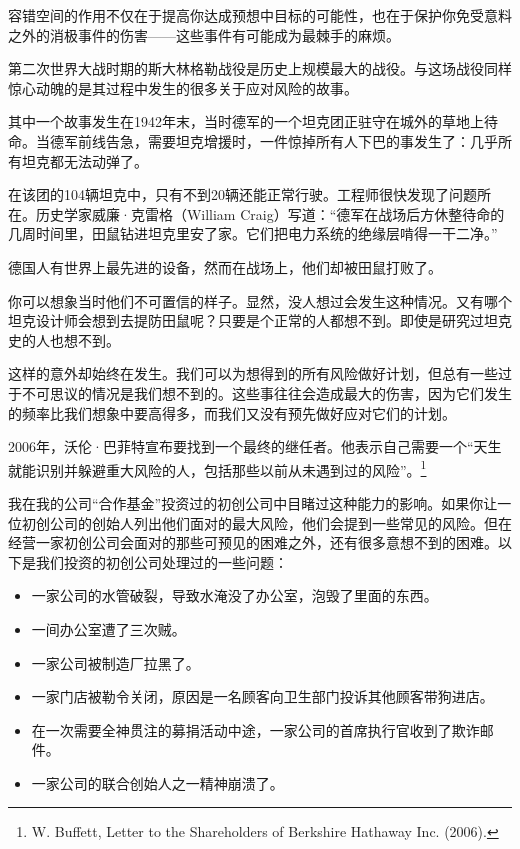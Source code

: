 容错空间的作用不仅在于提高你达成预想中目标的可能性，也在于保护你免受意料之外的消极事件的伤害——这些事件有可能成为最棘手的麻烦。

第二次世界大战时期的斯大林格勒战役是历史上规模最大的战役。与这场战役同样惊心动魄的是其过程中发生的很多关于应对风险的故事。

其中一个故事发生在1942年末，当时德军的一个坦克团正驻守在城外的草地上待命。当德军前线告急，需要坦克增援时，一件惊掉所有人下巴的事发生了：几乎所有坦克都无法动弹了。

在该团的104辆坦克中，只有不到20辆还能正常行驶。工程师很快发现了问题所在。历史学家威廉·克雷格（William Craig）写道：“德军在战场后方休整待命的几周时间里，田鼠钻进坦克里安了家。它们把电力系统的绝缘层啃得一干二净。”

德国人有世界上最先进的设备，然而在战场上，他们却被田鼠打败了。

你可以想象当时他们不可置信的样子。显然，没人想过会发生这种情况。又有哪个坦克设计师会想到去提防田鼠呢？只要是个正常的人都想不到。即使是研究过坦克史的人也想不到。

这样的意外却始终在发生。我们可以为想得到的所有风险做好计划，但总有一些过于不可思议的情况是我们想不到的。这些事往往会造成最大的伤害，因为它们发生的频率比我们想象中要高得多，而我们又没有预先做好应对它们的计划。

2006年，沃伦·巴菲特宣布要找到一个最终的继任者。他表示自己需要一个“天生就能识别并躲避重大风险的人，包括那些以前从未遇到过的风险”。\footnote{W. Buffett, Letter to the Shareholders of Berkshire Hathaway Inc. (2006).}

我在我的公司“合作基金”投资过的初创公司中目睹过这种能力的影响。如果你让一位初创公司的创始人列出他们面对的最大风险，他们会提到一些常见的风险。但在经营一家初创公司会面对的那些可预见的困难之外，还有很多意想不到的困难。以下是我们投资的初创公司处理过的一些问题：

\begin{itemize}

\item 一家公司的水管破裂，导致水淹没了办公室，泡毁了里面的东西。

\item 一间办公室遭了三次贼。

\item 一家公司被制造厂拉黑了。

\item 一家门店被勒令关闭，原因是一名顾客向卫生部门投诉其他顾客带狗进店。

\item 在一次需要全神贯注的募捐活动中途，一家公司的首席执行官收到了欺诈邮件。

\item 一家公司的联合创始人之一精神崩溃了。

\end{itemize}

